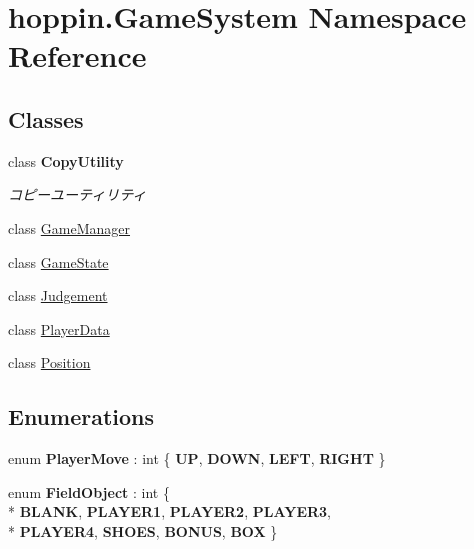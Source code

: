 \hypertarget{namespacehoppin_1_1_game_system}{}\section{hoppin.\+Game\+System Namespace Reference}
\label{namespacehoppin_1_1_game_system}
\subsection*{Classes}
\begin{DoxyCompactItemize}
\item 
class {\bfseries Copy\+Utility}
\begin{DoxyCompactList}\small\item\em コピーユーティリティ \end{DoxyCompactList}\item 
class \hyperlink{classhoppin_1_1_game_system_1_1_game_manager}{Game\+Manager}
\item 
class \hyperlink{classhoppin_1_1_game_system_1_1_game_state}{Game\+State}
\item 
class \hyperlink{classhoppin_1_1_game_system_1_1_judgement}{Judgement}
\item 
class \hyperlink{classhoppin_1_1_game_system_1_1_player_data}{Player\+Data}
\item 
class \hyperlink{classhoppin_1_1_game_system_1_1_position}{Position}
\end{DoxyCompactItemize}
\subsection*{Enumerations}
\begin{DoxyCompactItemize}
\item 
enum {\bfseries Player\+Move} \+: int \{ {\bfseries UP}, 
{\bfseries D\+O\+WN}, 
{\bfseries L\+E\+FT}, 
{\bfseries R\+I\+G\+HT}
 \}\hypertarget{namespacehoppin_1_1_game_system_a09ca9399921bb6094069df368b7c3f0f}{}\label{namespacehoppin_1_1_game_system_a09ca9399921bb6094069df368b7c3f0f}

\item 
enum {\bfseries Field\+Object} \+: int \{ \\*
{\bfseries B\+L\+A\+NK}, 
{\bfseries P\+L\+A\+Y\+E\+R1}, 
{\bfseries P\+L\+A\+Y\+E\+R2}, 
{\bfseries P\+L\+A\+Y\+E\+R3}, 
\\*
{\bfseries P\+L\+A\+Y\+E\+R4}, 
{\bfseries S\+H\+O\+ES}, 
{\bfseries B\+O\+N\+US}, 
{\bfseries B\+OX}
 \}\hypertarget{namespacehoppin_1_1_game_system_ac47818bbe2ebead6a8ff0f1c2655b3d0}{}\label{namespacehoppin_1_1_game_system_ac47818bbe2ebead6a8ff0f1c2655b3d0}

\end{DoxyCompactItemize}
